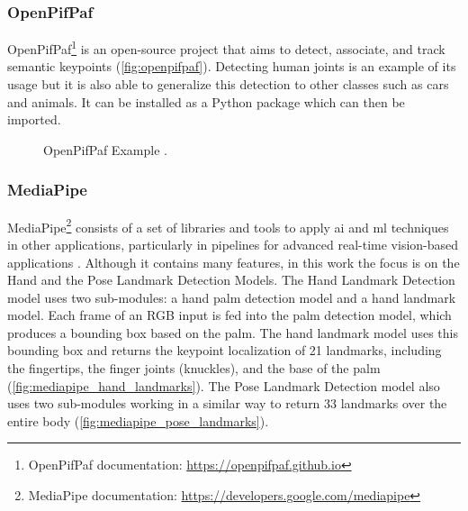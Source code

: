 \subsubsection{OpenPifPaf}

OpenPifPaf\cite{Kreiss2021,Kreiss2019}\footnote{OpenPifPaf documentation: \url{https://openpifpaf.github.io}} is an open-source project that aims to detect, associate, and track semantic keypoints (\autoref{fig:openpifpaf}). Detecting human joints is an example of its usage but it is also able to generalize this detection to other classes such as cars and animals. It can be installed as a Python package which can then be imported.

\begin{figure}[ht]
    \centering
    \caption[OpenPifPaf Example.]{OpenPifPaf Example \cite{Kreiss2021}.}
    \label{fig:openpifpaf}
\end{figure}

\subsubsection{MediaPipe}


MediaPipe\footnote{MediaPipe documentation: \url{https://developers.google.com/mediapipe}} consists of a set of libraries and tools to apply \acs{ai} and \acs{ml} techniques in other applications, particularly in pipelines for advanced real-time vision-based applications \cite{Lugaresi2019}. Although it contains many features, in this work the focus is on the Hand and the Pose Landmark Detection Models.
The Hand Landmark Detection model \cite{Zhang2020} uses two sub-modules: a hand palm detection model and a hand landmark model. Each frame of an RGB input is fed into the palm detection model, which produces a bounding box based on the palm. The hand landmark model uses this bounding box and returns the keypoint localization of 21 landmarks, including the fingertips, the finger joints (knuckles), and the base of the palm (\autoref{fig:mediapipe_hand_landmarks}). The Pose Landmark Detection model also uses two sub-modules working in a similar way to return 33 landmarks over the entire body (\autoref{fig:mediapipe_pose_landmarks}). %


